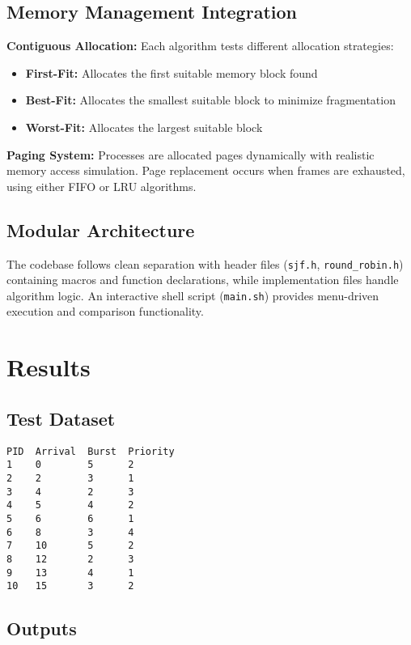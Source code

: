 \documentclass[12pt]{article}
\begin{document}
\subsection{Memory Management Integration}

\textbf{Contiguous Allocation:} Each algorithm tests different allocation strategies:
\begin{itemize}
    \item \textbf{First-Fit:} Allocates the first suitable memory block found
    \item \textbf{Best-Fit:} Allocates the smallest suitable block to minimize fragmentation
    \item \textbf{Worst-Fit:} Allocates the largest suitable block
\end{itemize}

\textbf{Paging System:} Processes are allocated pages dynamically with realistic memory access simulation. Page replacement occurs when frames are exhausted, using either FIFO or LRU algorithms.

\subsection{Modular Architecture}

The codebase follows clean separation with header files (\texttt{sjf.h}, \texttt{round\_robin.h}) containing macros and function declarations, while implementation files handle algorithm logic. An interactive shell script (\texttt{main.sh}) provides menu-driven execution and comparison functionality.

\section{Results}

\subsection{Test Dataset}
\begin{multicols}{2}
\begin{verbatim}
PID  Arrival  Burst  Priority
1    0        5      2
2    2        3      1
3    4        2      3
4    5        4      2
5    6        6      1
6    8        3      4
7    10       5      2
8    12       2      3
9    13       4      1
10   15       3      2
\end{verbatim}
\end{multicols}

\subsection{Outputs}
\end{document}
